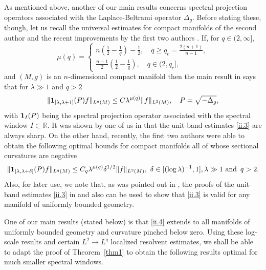 \documentclass[10pt]{amsart}
\newcommand{\la}{\lambda}
\newcommand{\1}{{\bf 1}}
\newcommand{\R}{{\mathbb R}}
\begin{document}
As mentioned above, another of our main results concerns spectral projection operators
associated with the Laplace-Beltrami operator $\Delta_g$.  Before stating these, though,
let us recall the universal estimates for compact manifolds of the second author
\cite{sogge88} and the recent improvements by the first two authors \cite{HSp}.  If, for $q\in (2,\infty]$,
\begin{equation}\label{ii.2}
\mu(q)=
\begin{cases}
n(\tfrac12-\tfrac1q)-\frac12, \quad q\ge q_c=\tfrac{2(n+1)}{n-1},
\\
\tfrac{n-1}2(\tfrac12-\tfrac1q), \quad q\in (2,q_c],
\end{cases}
\end{equation}
and $(M,g)$ is an $n$-dimensional compact manifold then the main result in \cite{sogge88} 
says that for $\la\gg 1$ and $q>2$
\begin{equation}\label{ii.3}
\| \1_{[\la,\la+1]}(P) f\|_{L^q(M)}\le C\la^{\mu(q)} \|f\|_{L^2(M)}, \quad P=\sqrt{-\Delta_g},
\end{equation}
with $\1_I(P)$ being the spectral projection operator associated with the spectral window
$I\subset \R$.
It was shown by one of us in \cite{SFIO2} that the unit-band estimates \eqref{ii.3}
are always sharp.  On the other hand, recently, the first two authors were able to obtain
the following optimal bounds for compact manifolds all of whose sectional curvatures
are negative
\begin{equation}\label{ii.4}
\|\1_{[\la,\la+\delta]}(P) f\|_{L^q(M)}\le C_q \la^{\mu(q)}\delta^{1/2}
\|f\|_{L^2(M)}, \,  \, \delta\in [(\log\la)^{-1},1],
\la\gg 1 \, \, \text{and } \, q>2.
\end{equation}
Also, for later use, we note that, as was pointed out in \cite{AGL}, the proofs of the unit-band estimates
\eqref{ii.3} in \cite{sogge88} and \cite{SFIO2} also can be used to show that
\eqref{ii.3} is valid for any manifold of uniformly bounded geometry.


One of our main results (stated below) is that \eqref{ii.4} extends to all manifolds
of uniformly bounded geometry and curvature pinched below zero.  Using these
log-scale results and certain $L^2\to L^q$ localized resolvent estimates, 
we shall be able to adapt the proof of Theorem~\ref{thm1}
to obtain the following results optimal for much smaller spectral windows.
\end{document}
